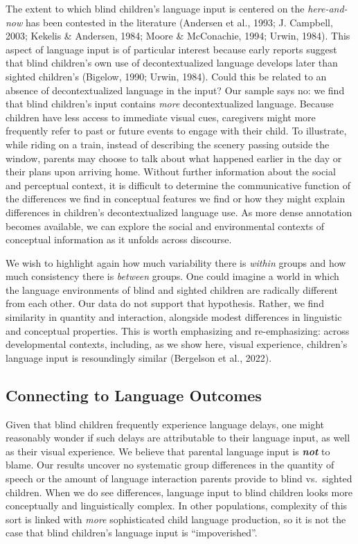 \documentclass[
  man]{apa6}
\begin{document}
The extent to which blind children's language input is centered on the \emph{here-and-now} has been contested in the literature (Andersen et al., 1993; J. Campbell, 2003; Kekelis \& Andersen, 1984; Moore \& McConachie, 1994; Urwin, 1984). This aspect of language input is of particular interest because early reports suggest that blind children's own use of decontextualized language develops later than sighted children's (Bigelow, 1990; Urwin, 1984). Could this be related to an absence of decontextualized language in the input? Our sample says no: we find that blind children's input contains \emph{more} decontextualized language. Because children have less access to immediate visual cues, caregivers might more frequently refer to past or future events to engage with their child. To illustrate, while riding on a train, instead of describing the scenery passing outside the window, parents may choose to talk about what happened earlier in the day or their plans upon arriving home. Without further information about the social and perceptual context, it is difficult to determine the communicative function of the differences we find in conceptual features we find or how they might explain differences in children's decontextualized language use. As more dense annotation becomes available, we can explore the social and environmental contexts of conceptual information as it unfolds across discourse.

We wish to highlight again how much variability there is \emph{within} groups and how much consistency there is \emph{between} groups. One could imagine a world in which the language environments of blind and sighted children are radically different from each other. Our data do not support that hypothesis. Rather, we find similarity in quantity and interaction, alongside modest differences in linguistic and conceptual properties. This is worth emphasizing and re-emphasizing: across developmental contexts, including, as we show here, visual experience, children's language input is resoundingly similar (Bergelson et al., 2022).

\hypertarget{connecting-to-language-outcomes}{%
\subsection{Connecting to Language Outcomes}\label{connecting-to-language-outcomes}}

Given that blind children frequently experience language delays, one might reasonably wonder if such delays are attributable to their language input, as well as their visual experience. We believe that parental language input is \textbf{\emph{not}} to blame. Our results uncover no systematic group differences in the quantity of speech or the amount of language interaction parents provide to blind vs.~sighted children. When we do see differences, language input to blind children looks more conceptually and linguistically complex. In other populations, complexity of this sort is linked with \emph{more} sophisticated child language production, so it is not the case that blind children's language input is ``impoverished''.
\end{document}

